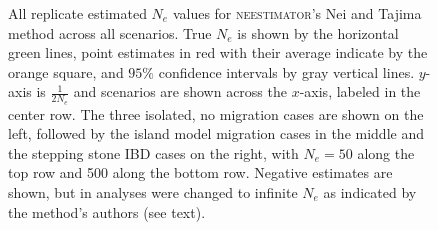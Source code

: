 \begin{landscape}
\begin{figure}[ht]
\centering
{}
\caption[ ~~ - All replicate estimated $N_e$ values for \textsc{neestimator}'s Nei and Tajima method across all scenarios.]{All replicate estimated $N_e$ values for \textsc{neestimator}'s Nei and Tajima method across all scenarios. True $N_e$ is shown by the horizontal green lines, point estimates in red with their average indicate by the orange square, and $95\%$ confidence intervals by gray vertical lines. $y$-axis is $\frac{1}{2 N_e}$ and scenarios are shown across the $x$-axis, labeled in the center row. The three isolated, no migration cases are shown on the left, followed by the island model migration cases in the middle and the stepping stone IBD cases on the right, with $N_e = 50$ along the top row and 500 along the bottom row. Negative estimates are shown, but in analyses were changed to infinite $N_e$ as indicated by the method's authors (see text).}
\label{fig:supp_nei}
\end{figure}



\end{landscape}
